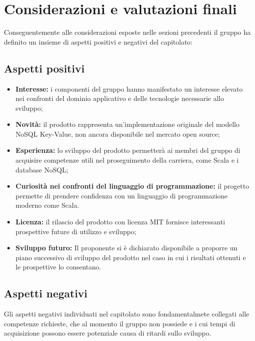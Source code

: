 \documentclass[a4paper]{report}
\begin{document}
		\section{Considerazioni e valutazioni finali}
			Conseguentemente alle considerazioni esposte nelle sezioni precedenti il gruppo ha definito un 
			insieme di aspetti positivi e negativi del capitolato:
			\subsection{Aspetti positivi}
				\begin{itemize}
					\item \textbf{Interesse:} i componenti del gruppo hanno manifestato un interesse elevato 
					nei confronti del dominio applicativo e delle tecnologie necessarie allo sviluppo;
					\item \textbf{Novità:} il prodotto rappresenta un'implementazione originale del modello 
					NoSQL Key-Value, non ancora disponibile nel mercato open source;
					\item \textbf{Esperienza:} lo sviluppo del prodotto permetterà ai membri del gruppo di 
					acquisire competenze utili nel proseguimento della carriera, come Scala e i database NoSQL;
					\item \textbf{Curiosità nei confronti del linguaggio di programmazione:} il progetto permette 
					di prendere confidenza con un linguaggio di programmazione moderno come Scala.
					\item \textbf{Licenza:} il rilascio del prodotto con licenza MIT fornisce interessanti
					 prospettive future di utilizzo e sviluppo;
					\item \textbf{Sviluppo futuro:} Il proponente si è dichiarato disponibile a proporre un piano
					successivo di sviluppo del prodotto nel caso in cui i risultati ottenuti e le prospettive lo
					 consentano.
				\end{itemize}
			\subsection{Aspetti negativi}
				Gli aspetti negativi individuati nel capitolato sono fondamentalmete collegati alle competenze 
				richieste, che al momento il gruppo non possiede e i cui tempi di acquisizione possono essere
				potenziale causa di ritardi sullo sviluppo.
	
	\cleardoublepage
	\listoftables
		
\end{document}
